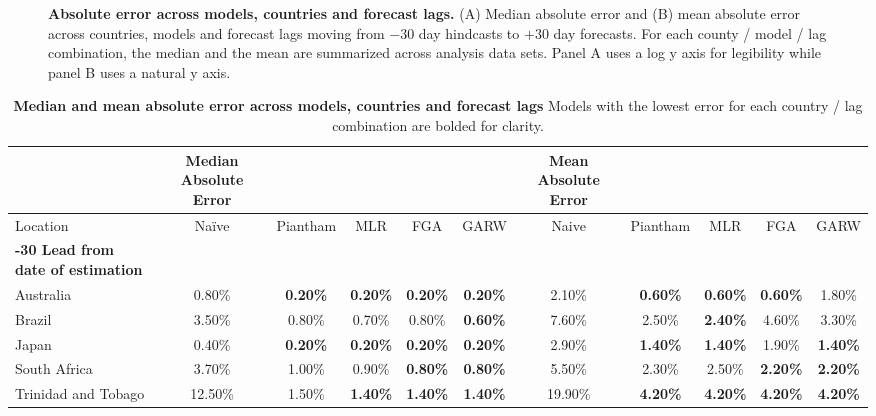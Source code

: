 \documentclass[10pt,letterpaper]{article}
\begin{document}
\begin{figure}[h!]
	\centering
	\caption{\textbf{Absolute error across models, countries and forecast lags.}
	(A) Median absolute error and (B) mean absolute error across countries, models and forecast lags moving from $-30$ day hindcasts to $+30$ day forecasts.
	For each county / model / lag combination, the median and the mean are summarized across analysis data sets.
	Panel A uses a log y axis for legibility while panel B uses a natural y axis.
	}
	\label{fig:Fig2}
\end{figure}

\begin{table}[!ht]
	\begin{adjustwidth}{-2.25in}{0in}
    \centering
	\caption{
		\textbf{Median and mean absolute error across models, countries and forecast lags}
		Models with the lowest error for each country / lag combination are bolded for clarity.
		}
		\label{table:Table1}
    \begin{tabular}{|l|c|c|c|c|c|c|c|c|c|c|}
    \hline
        ~ &  \textbf{Median Absolute Error} & ~ & ~ & ~ & ~ & \textbf{Mean Absolute Error} & ~ & ~ & ~ \\ \hline
        Location & Naïve & Piantham & MLR & FGA & GARW & Naive & Piantham & MLR & FGA & GARW \\ \hline
        \textbf{-30 Lead from date of estimation} & ~ & ~ & ~ & ~ & ~ & ~ & ~ & ~ & ~ & ~ \\ \hline
		Australia & 0.80\% & \textbf{0.20\%} & \textbf{0.20\%} & \textbf{0.20\%} & \textbf{0.20\%} & 2.10\% & \textbf{0.60\%} & \textbf{0.60\%} & \textbf{0.60\%} & 1.80\% \\ \hline
        Brazil    & 3.50\% & 0.80\% & 0.70\% & 0.80\% & \textbf{0.60\%} & 7.60\% & 2.50\% & \textbf{2.40\%} & 4.60\% & 3.30\% \\ \hline
        Japan     & 0.40\% & \textbf{0.20\%} & \textbf{0.20\%} & \textbf{0.20\%} & \textbf{0.20\%} & 2.90\% & \textbf{1.40\%} & \textbf{1.40\%} & 1.90\% & \textbf{1.40\%} \\ \hline
        South Africa & 3.70\% & 1.00\% & 0.90\% & \textbf{0.80\%} & \textbf{0.80\%} & 5.50\% & 2.30\% & 2.50\% & \textbf{2.20\%} & \textbf{2.20\%} \\ \hline
        Trinidad and Tobago & 12.50\% & 1.50\% & \textbf{1.40\%} & \textbf{1.40\%} & \textbf{1.40\%} & 19.90\% & \textbf{4.20\%} & \textbf{4.20\%} & \textbf{4.20\%} & \textbf{4.20\%} \\ \hline

\end{tabular}
\end{adjustwidth}
\end{table}
\end{document}
